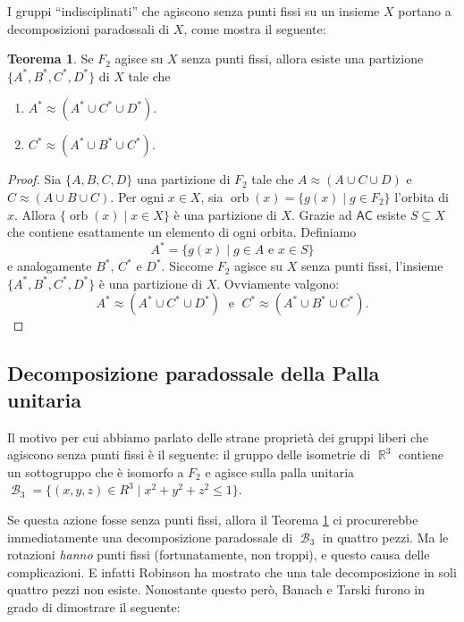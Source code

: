 \documentclass[12pt,a4paper]{report}
\theoremstyle{definition}
\newtheorem{teo}{Teorema}[section]  %
\theoremstyle{num.custom-title}
\DeclareMathOperator{\orb}{orb}
\DeclareMathOperator{\B}{\mathcal{B}}
\DeclareMathOperator{\R}{\mathbb{R}}
\newcommand{\AC}{\ensuremath{\mathsf{AC}}\xspace}
\begin{document}
I gruppi ``indisciplinati'' che agiscono senza punti fissi su un insieme $X$ portano a decomposizioni paradossali di $X$, come mostra il seguente:

\begin{teo}\label{decomp_F2}
Se $F_2$ agisce su $X$ senza punti fissi, allora esiste una partizione $\{A^*,B^*,C^*,D^*\}$ di $X$ tale che 
\begin{enumerate}
\item $A^* \approx (A^* \cup C^* \cup D^*)$.
\item $C^* \approx (A^* \cup B^* \cup C^*)$.
\end{enumerate}
\begin{proof}
Sia $\{A,B,C,D\}$ una partizione di $F_2$ tale che $A \approx (A \cup C \cup D)$ e $C \approx (A \cup B \cup C)$. Per ogni $x \in X$, sia $\orb(x)=\{g(x) \mid g \in F_2\}$ l'orbita di $x$. Allora $\{\orb(x) \mid x \in X\}$ è una partizione di $X$. Grazie ad \AC esiste $S \subseteq X$ che contiene esattamente un elemento di ogni orbita. Definiamo
\[
A^*=\{g(x) \mid g \in A \text{ e } x \in S\}
\]
e analogamente $B^*$, $C^*$ e $D^*$. Siccome $F_2$ agisce su $X$ senza punti fissi, l'insieme $\{A^*,B^*,C^*,D^*\}$ è una partizione di $X$. Ovviamente valgono:
\[
A^* \approx (A^* \cup C^* \cup D^*) \; \text{ e } \; C^* \approx (A^* \cup B^* \cup C^*).
\]
\end{proof}
\end{teo}



\subsection{Decomposizione paradossale della Palla unitaria}

Il motivo per cui abbiamo parlato delle strane proprietà dei gruppi liberi che agiscono senza punti fissi è il seguente: il gruppo delle isometrie di $\R^3$ contiene un sottogruppo che è isomorfo a $F_2$ e agisce sulla palla unitaria $\B_3=\{(x,y,z) \in R^3 \mid x^2+y^2+z^2 \leq 1\}$.

Se questa azione fosse senza punti fissi, allora il Teorema \ref{decomp_F2} ci procurerebbe immediatamente una decomposizione paradossale di $\B_3$ in quattro pezzi. Ma le rotazioni \emph{hanno} punti fissi (fortunatamente, non troppi), e questo causa delle complicazioni. E infatti Robinson ha mostrato che una tale decomposizione in soli quattro pezzi non esiste. Nonostante questo però, Banach e Tarski furono in grado di dimostrare il seguente:
\end{document}
